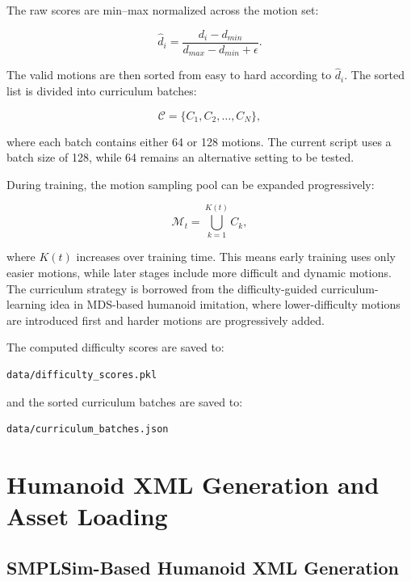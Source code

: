 \documentclass[11pt,a4paper]{article}
\begin{document}
The raw scores are min--max normalized across the motion set:

\begin{equation}
    \hat{d}_i =
    \frac{d_i - d_{min}}{d_{max} - d_{min} + \epsilon}.
\end{equation}

The valid motions are then sorted from easy to hard according to $\hat{d}_i$.
The sorted list is divided into curriculum batches:

\begin{equation}
    \mathcal{C} = \{C_1, C_2, \dots, C_N\},
\end{equation}

where each batch contains either 64 or 128 motions.
The current script uses a batch size of 128, while 64 remains an alternative setting to be tested.

During training, the motion sampling pool can be expanded progressively:

\begin{equation}
    \mathcal{M}_t = \bigcup_{k=1}^{K(t)} C_k,
\end{equation}

where $K(t)$ increases over training time.
This means early training uses only easier motions, while later stages include more difficult and dynamic motions.
The curriculum strategy is borrowed from the difficulty-guided curriculum-learning idea in MDS-based humanoid imitation, where lower-difficulty motions are introduced first and harder motions are progressively added.

The computed difficulty scores are saved to:

\begin{lstlisting}
data/difficulty_scores.pkl
\end{lstlisting}

and the sorted curriculum batches are saved to:

\begin{lstlisting}
data/curriculum_batches.json
\end{lstlisting}

\section{Humanoid XML Generation and Asset Loading}

\subsection{SMPLSim-Based Humanoid XML Generation}
\end{document}
